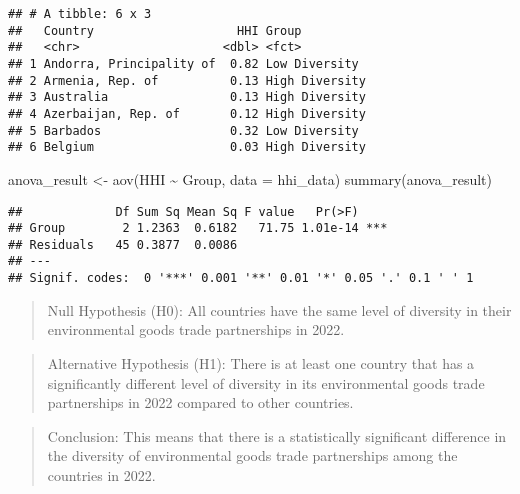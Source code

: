 \documentclass[
]{article}
\newenvironment{Shaded}{\begin{snugshade}}{\end{snugshade}}
\newcommand{\AttributeTok}[1]{\textcolor[rgb]{0.77,0.63,0.00}{#1}}
\newcommand{\FunctionTok}[1]{\textcolor[rgb]{0.00,0.00,0.00}{#1}}
\newcommand{\NormalTok}[1]{#1}
\newcommand{\OtherTok}[1]{\textcolor[rgb]{0.56,0.35,0.01}{#1}}
\newcommand{\SpecialCharTok}[1]{\textcolor[rgb]{0.00,0.00,0.00}{#1}}
\begin{document}
\begin{verbatim}
## # A tibble: 6 x 3
##   Country                    HHI Group         
##   <chr>                    <dbl> <fct>         
## 1 Andorra, Principality of  0.82 Low Diversity 
## 2 Armenia, Rep. of          0.13 High Diversity
## 3 Australia                 0.13 High Diversity
## 4 Azerbaijan, Rep. of       0.12 High Diversity
## 5 Barbados                  0.32 Low Diversity 
## 6 Belgium                   0.03 High Diversity
\end{verbatim}

\begin{Shaded}
\begin{Highlighting}[]
\NormalTok{anova\_result }\OtherTok{\textless{}{-}} \FunctionTok{aov}\NormalTok{(HHI }\SpecialCharTok{\textasciitilde{}}\NormalTok{ Group, }\AttributeTok{data =}\NormalTok{ hhi\_data)}
\FunctionTok{summary}\NormalTok{(anova\_result)}
\end{Highlighting}
\end{Shaded}

\begin{verbatim}
##             Df Sum Sq Mean Sq F value   Pr(>F)    
## Group        2 1.2363  0.6182   71.75 1.01e-14 ***
## Residuals   45 0.3877  0.0086                     
## ---
## Signif. codes:  0 '***' 0.001 '**' 0.01 '*' 0.05 '.' 0.1 ' ' 1
\end{verbatim}

\begin{quote}
Null Hypothesis (H0): All countries have the same level of diversity in
their environmental goods trade partnerships in 2022.
\end{quote}

\begin{quote}
Alternative Hypothesis (H1): There is at least one country that has a
significantly different level of diversity in its environmental goods
trade partnerships in 2022 compared to other countries.
\end{quote}

\begin{quote}
Conclusion: This means that there is a statistically significant
difference in the diversity of environmental goods trade partnerships
among the countries in 2022.
\end{quote}
\end{document}
